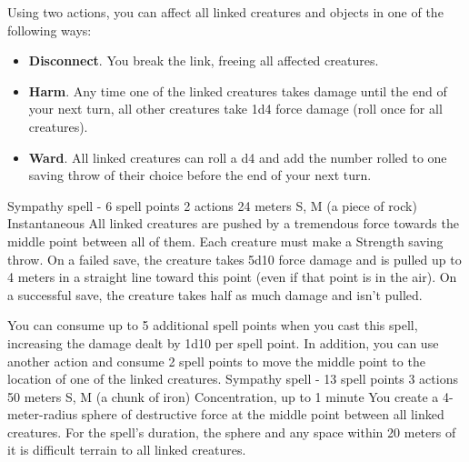         Using two actions, you can affect all linked creatures and objects in one of the following ways:
        \begin{itemize}
            \item \textbf{Disconnect}.
            You break the link, freeing all affected creatures.
            \item \textbf{Harm}.
            Any time one of the linked creatures takes damage until the end of your next turn, all other creatures take 1d4 force damage (roll once for all creatures).
            \item \textbf{Ward}.
            All linked creatures can roll a d4 and add the number rolled to one saving throw of their choice before the end of your next turn.
        \end{itemize}
        {Sympathy spell - 6 spell points}
        {2 actions}
        {24 meters}
        {S, M (a piece of rock)}
        {Instantaneous}
        All linked creatures are pushed by a tremendous force towards the middle point between all of them.
        Each creature must make a Strength saving throw.
        On a failed save, the creature takes 5d10 force damage and is pulled up to 4 meters in a straight line toward this point (even if that point is in the air).
        On a successful save, the creature takes half as much damage and isn't pulled.

        You can consume up to 5 additional spell points when you cast this spell, increasing the damage dealt by 1d10 per spell point.
        In addition, you can use another action and consume 2 spell points to move the middle point to the location of one of the linked creatures.
        {Sympathy spell - 13 spell points}
        {3 actions}
        {50 meters}
        {S, M (a chunk of iron)}
        {Concentration, up to 1 minute}
        You create a 4-meter-radius sphere of destructive force at the middle point between all linked creatures.
        For the spell's duration, the sphere and any space within 20 meters of it is difficult terrain to all linked creatures.

